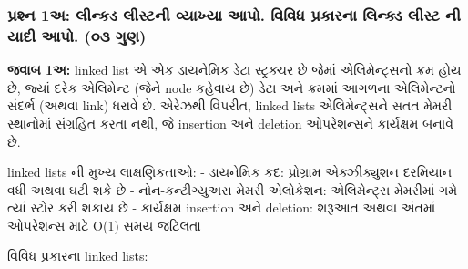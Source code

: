 \begin{Shaded}
\begin{Highlighting}[]
\end{Highlighting}
\end{Shaded}

\hypertarget{uxaaauxab0uxab6uxaa8-1uxa85-uxab2uxaa8uxa95uxaa1-uxab2uxab8uxa9fuxaa8-uxab5uxaafuxa96uxaaf-uxa86uxaaa.-uxab5uxab5uxaa7-uxaaauxab0uxa95uxab0uxaa8-uxab2uxaa8uxa95uxaa1-uxab2uxab8uxa9f-uxaa8-uxaafuxaa6-uxa86uxaaa.-uxae6uxae9-uxa97uxaa3}{%
\subsubsection{પ્રશ્ન 1અ: લીન્કડ લીસ્ટની વ્યાખ્યા આપો. વિવિધ પ્રકારના લિન્ક્ડ
લીસ્ટ ની યાદી આપો. (૦૩
ગુણ)}\label{uxaaauxab0uxab6uxaa8-1uxa85-uxab2uxaa8uxa95uxaa1-uxab2uxab8uxa9fuxaa8-uxab5uxaafuxa96uxaaf-uxa86uxaaa.-uxab5uxab5uxaa7-uxaaauxab0uxa95uxab0uxaa8-uxab2uxaa8uxa95uxaa1-uxab2uxab8uxa9f-uxaa8-uxaafuxaa6-uxa86uxaaa.-uxae6uxae9-uxa97uxaa3}}

\textbf{જવાબ 1અ:} linked list એ એક ડાયનેમિક ડેટા સ્ટ્રક્ચર છે જેમાં એલિમેન્ટ્સનો
ક્રમ હોય છે, જ્યાં દરેક એલિમેન્ટ (જેને node કહેવાય છે) ડેટા અને ક્રમમાં આગળના એલિમેન્ટનો
સંદર્ભ (અથવા link) ધરાવે છે. એરેઝથી વિપરીત, linked lists એલિમેન્ટ્સને સતત મેમરી
સ્થાનોમાં સંગ્રહિત કરતા નથી, જે insertion અને deletion ઓપરેશન્સને કાર્યક્ષમ બનાવે છે.

linked lists ની મુખ્ય લાક્ષણિકતાઓ: - ડાયનેમિક કદ: પ્રોગ્રામ એક્ઝીક્યુશન દરમિયાન
વધી અથવા ઘટી શકે છે - નોન-કન્ટીગ્યુઅસ મેમરી એલોકેશન: એલિમેન્ટ્સ મેમરીમાં ગમે ત્યાં સ્ટોર
કરી શકાય છે - કાર્યક્ષમ insertion અને deletion: શરૂઆત અથવા અંતમાં ઓપરેશન્સ માટે
O(1) સમય જટિલતા

વિવિધ પ્રકારના linked lists:

